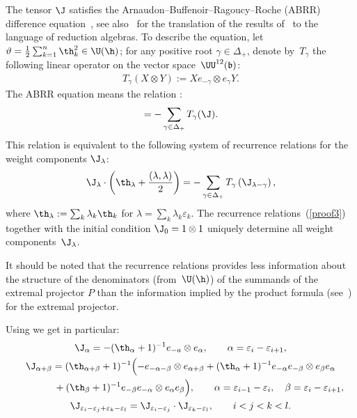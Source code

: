 \documentclass[11pt]{article}
\def\a{\alpha}\def\Ar{{\rm A}}\def\Ab{\bar{\rm A}}\def\b{\beta}\def\bb{\mathfrak{b}}
\def\UUb{\UU^{12}(\bb)}\def\V{\mathrm {V}}\def\ve{\varepsilon}\def\Z{\mathrm{Z}}\def\SZ{\mathrm{SZ}}
\numberwithin{equation}{section}
\begin{document}
The tensor $\J$ satisf\/ies the Arnaudon--Buf\/fenoir--Ragoucy--Roche (ABRR) dif\/ference equation~\cite{ABRR}, see also~\cite{K} for the translation of the results of~\cite{ABRR} to the language
of reduction algebras. To describe the equation, let  $\vartheta=\frac{1}{2}
\sum_{k=1}^n\th_k^2\in \U(\h)$;
for any positive root $\gamma\in\Delta_+$, denote by~$T_\gamma$ the following linear operator on the vector space~$\UUb$:
\begin{gather*}T_{\gamma}(X\otimes Y):=X e_{-\gamma}\otimes e_{\gamma}Y  .\end{gather*}
The ABRR equation means the relation \cite{ABRR,K}:
\begin{gather*}%
[1\otimes \vartheta, \J]=-\sum_{\gamma\in\Delta_+}T_{\gamma}(\J)
 .
\end{gather*}
This relation is equivalent to the following system of recurrence relations for the weight components
$\J_\lambda$:
\begin{gather} \label{proof3}
\J_\lambda\cdot\left(\th_\lambda+\frac{(\lambda,\lambda)}{2}\right)=
-\sum_{\gamma\in\Delta_+}T_\gamma\left(\J_{\lambda-\gamma}\right)  ,
\end{gather}
where $\th_\lambda :=\sum_k\lambda_k\th_k$ for $\lambda=\sum_k\lambda_k\ve_k$. The recurrence
relations~(\ref{proof3})  together with the initial condition $\J_0=1\otimes 1$
uniquely determine all weight components~$\J_\lambda$.


It should be noted that the recurrence relations  provides less information about the structure of the denominators (from~$\U (\h )$)
of the summands of the extremal projector $P$ than the information implied
 by the product formula (see~\cite{AST}) for the extremal projector.


Using  we get in particular:
\begin{gather} \label{proof3a}
\J_{\a}  = -(\th_{\a}+1)^{-1}e_{-a}\otimes e_{\a} ,
\qquad \a=\ve_i-\ve_{i+1} ,
\\ \notag
 \J_{\a+\beta}  =  (\th_{\a+\b}+1)^{-1}\Bigl(-e_{-\a-\b}\otimes e_{\a+\b}+
(\th_{\a}+1)^{-1} e_{-\a}e_{-\b}\otimes e_{\b}e_{\a}\\
\phantom{\J_{\a+\beta}  =}{}  +(\th_{\b}+1)^{-1} e_{-\b}e_{-\a}\otimes e_{\a}e_{\b}\Bigr)
  ,\qquad \a=\ve_{i-1}-\ve_{i}  ,\quad \b=\ve_{i}-\ve_{i+1}  ,\label{proof3b}
\\
  \label{proof3c}\J_{\ve_i-\ve_{j}+\ve_k-\ve_{l}}= \J_{\ve_i-\ve_{j}}\cdot
\J_{\ve_k-\ve_{l}}  ,\qquad  i<j<k<l  .
\end{gather}
\end{document}
